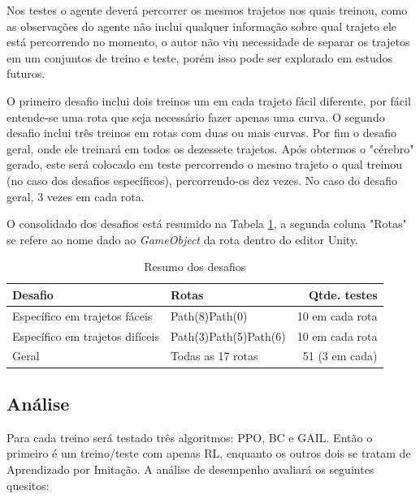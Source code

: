 Nos testes o agente deverá percorrer os mesmos trajetos nos quais treinou, como as observações do agente não inclui qualquer informação sobre qual trajeto ele está percorrendo no momento, o autor não viu necessidade de separar os trajetos em um conjuntos de treino e teste, porém isso pode ser explorado em estudos futuros. 

O primeiro desafio inclui dois treinos um em cada trajeto fácil diferente, por fácil entende-se uma rota que seja necessário fazer apenas uma curva. O segundo desafio inclui três treinos em rotas com duas ou mais curvas. Por fim o desafio geral, onde ele treinará em todos os dezessete trajetos. Após obtermos o "cérebro" gerado, este será colocado em teste percorrendo o mesmo trajeto o qual treinou (no caso dos desafios específicos), percorrendo-os dez vezes. No caso do desafio geral, 3 vezes em cada rota.

O consolidado dos desafios está resumido na Tabela \ref{tabela-testes}, a segunda coluna "Rotas" se refere ao nome dado ao \textit{GameObject} da rota dentro do editor Unity.

\begin{table}[htpb]
   \centering
   \caption{Resumo dos desafios}
   \label{tabela-testes}
   \begin{tabular}{|l|p{4cm}|r|}
        \hline
        \small{Desafio}                      & \small{Rotas}                              & \small{Qtde. testes}     \\ \hline
         Específico em trajetos fáceis       & Path(8)\newline Path(0)                    &      10 em cada rota     \\ \hline
         Específico em trajetos difíceis     & Path(3)\newline Path(5)\newline Path(6)    &      10 em cada rota     \\ \hline
         Geral                               & Todas as 17 rotas                          &      51 (3 em cada)      \\ \hline
   \end{tabular}
\end{table}

\subsection{Análise}
Para cada treino será testado três algoritmos: PPO, BC e GAIL. Então o primeiro é um treino/teste com apenas RL, enquanto os outros dois se tratam de Aprendizado por Imitação. A análise de desempenho avaliará os seguintes quesitos:

